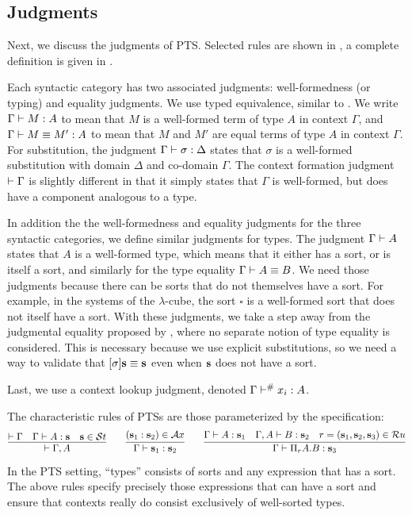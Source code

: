 \subsection{Judgments}



Next, we discuss the judgments of \ac{PTS}.
Selected rules are shown in , a complete definition is given in .

Each syntactic category has two associated judgments: well-formedness (or typing) and equality judgments.
We use typed equivalence, similar to \citet{A06}.
We write $\Gamma \vdash M : A$ to mean that $M$ is a well-formed term of type $A$ in context $\Gamma$,
  and $\Gamma \vdash M \equiv M' : A$ to mean that $M$ and $M'$ are equal terms of type $A$ in context $\Gamma$.
For substitution, the judgment $\Gamma \vdash \sigma : \Delta$ states that $\sigma$ is a well-formed substitution with domain $\Delta$ and co-domain $\Gamma$.
The context formation judgment $\vdash \Gamma$ is slightly different in that it simply states that $\Gamma$ is well-formed, but does have a component analogous to a type.

In addition the the well-formedness and equality judgments for the three syntactic categories, we define similar judgments for types.
The judgment $\Gamma \vdash A$ states that $A$ is a well-formed type, which means that it either has a sort, or is itself a sort, and similarly for the type equality $\Gamma \vdash A \equiv B$.
We need those judgments because there can be sorts that do not themselves have a sort.
For example, in the systems of the $\lambda$-cube, the sort $\square$ is a well-formed sort that does not itself have a sort.
With these judgments, we take a step away from the judgmental equality proposed by \citet{A06}, where no separate notion of type equality is considered.
This is necessary because we use explicit substitutions, so we need a way to validate that $[\sigma]\textbf{s} \equiv \textbf{s}$ even when $\textbf{s}$ does not have a sort.

Last, we use a context lookup judgment, denoted $\ctxlookup \Gamma {x_i} A$.

The characteristic rules of \acp{PTS} are those parameterized by the specification:
\[
\infer{
  \wfctx {\ctxext \Gamma A}
}{
  \wfctx \Gamma
  &
  \wfexp \Gamma A {\tmcst s}
  &
  \tmcst s \in \St
}
\qquad
\infer{
  \wfexp \Gamma {\tmcst s_1} {\tmcst s_2}
}{
  (\tmcst s_1 : \tmcst s_2) \in \Ax
}
\qquad
\infer{
  \wfexp \Gamma {\tppi A B} {\tmcst s_3}
}{
  \wfexp \Gamma A {\tmcst s_1}
  &
  \wfexp {\ctxext \Gamma A} B {\tmcst s_2}
  &
  r = (\tmcst s_1, \tmcst s_2, \tmcst s_3) \in \Ru
}
\]
In the \ac{PTS} setting, ``types'' consists of sorts and any expression that has a sort.
The above rules specify precisely those expressions that can have a sort and ensure that contexts really do consist exclusively of well-sorted types.

